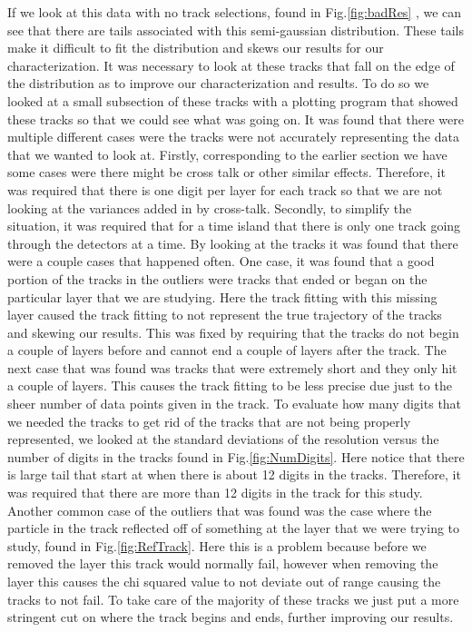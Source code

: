 \documentclass[./Thesis]{subfiles}
\begin{document}
	If we look at this data with no track selections, found in Fig.\ref{fig:badRes} , we can see that there are tails associated with this semi-gaussian distribution. These tails make it difficult to fit the distribution and skews our results for our characterization.  It was necessary to look at these tracks that fall on the edge of the distribution as to improve our characterization and results.  To do so we looked at a small subsection of these tracks with a plotting program that showed these tracks so that we could see what was going on.  It was found that there were multiple different cases were the tracks were not accurately representing the data that we wanted to look at. Firstly, corresponding to the earlier section we have some cases were there might be cross talk or other similar effects.  Therefore, it was required that there is one digit per layer for each track so that we are not looking at the variances added in by cross-talk.  Secondly, to simplify the situation, it was required that for a time island that there is only one track going through the detectors at a time.  By looking at the tracks it was found that there were a couple cases that happened often.  One case, it was found that a good portion of the tracks in the outliers were tracks that ended or began on the particular layer that we are studying. Here the track fitting with this missing layer caused the track fitting to not represent the true trajectory of the tracks and skewing our results.  This was fixed by requiring that the tracks do not begin a couple of layers before and cannot end a couple of layers after the track.  The next case that was found was tracks that were extremely short and they only hit a couple of layers.  This causes the track fitting to be less precise due just to the sheer number of data points given in the track.  To evaluate how many digits that we needed the tracks to get rid of the tracks that are not being properly represented, we looked at the standard deviations of the resolution versus the number of digits in the tracks found in Fig.\ref{fig:NumDigits}. Here notice that there is large tail that start at when there is about 12 digits in the tracks.  Therefore, it was required that there are more than 12 digits in the track for this study.  Another common case of the outliers that was found was the case where the particle in the track reflected off of something at the layer that we were trying to study, found in Fig.\ref{fig:RefTrack}. Here this is a problem because before we removed the layer this track would normally fail, however when removing the layer this causes the chi squared value to not deviate out of range causing the tracks to not fail.  To take care of the majority of these tracks we just put a more stringent cut on where the track begins and ends, further improving our results.
		
\end{document}
